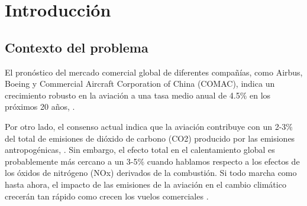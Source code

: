 

\chapter{Introducción}


\section{Contexto del problema}
%
%
El pronóstico del mercado comercial global de diferentes compañías, como Airbus, Boeing y Commercial Aircraft Corporation of China (COMAC), indica un crecimiento robusto en la aviación a una tasa medio anual de 4.5$\%$  en los próximos 20 años, \cite{CHEN2019}.

Por otro lado, el consenso actual indica que la aviación contribuye con un 2-3$\%$ del total de emisiones de dióxido de carbono (CO2) producido por las emisiones antropogénicas, \cite{CHEN2019}. Sin embargo, el efecto total en el calentamiento global es probablemente más cercano a un 3-5$\%$ cuando hablamos respecto a los efectos de los óxidos de nitrógeno (NOx) derivados de la combustión. Si todo marcha como hasta ahora, el impacto de las emisiones de la aviación en el cambio climático crecerán tan rápido como crecen los vuelos comerciales \cite{CHEN2019}.

